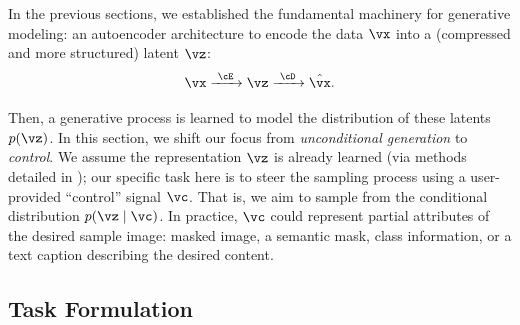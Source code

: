\documentclass[../../book-main.tex]{subfiles}
\begin{document}
In the previous sections, we established the fundamental machinery
for generative modeling: an autoencoder architecture to encode the data \(\vx\) into a (compressed and more structured) latent \(\vz\):
\begin{equation}
\vx \xrightarrow{\hspace{1mm} \cE \hspace{1mm}} \vz
\xrightarrow{\hspace{1mm} \cD \hspace{1mm}} \hat{\vx} .
\end{equation}

Then, a generative process is learned to model the distribution of these latents \(p(\vz)\).
In this section, we shift our focus from \textit{unconditional generation} to \textit{control}.
We assume the representation \(\vz\) is already learned (via methods detailed in );
our specific task here is to steer the sampling process using a user-provided ``control'' signal \(\vc\).
That is, we aim to sample from the conditional distribution \(p(\vz \mid \vc)\).
In practice, \(\vc\) could represent partial attributes of the desired sample image: masked image, a semantic mask, class information, or a text caption describing the desired content.

\subsection{Task Formulation}
\label{subsec:cond_problem}
\end{document}
